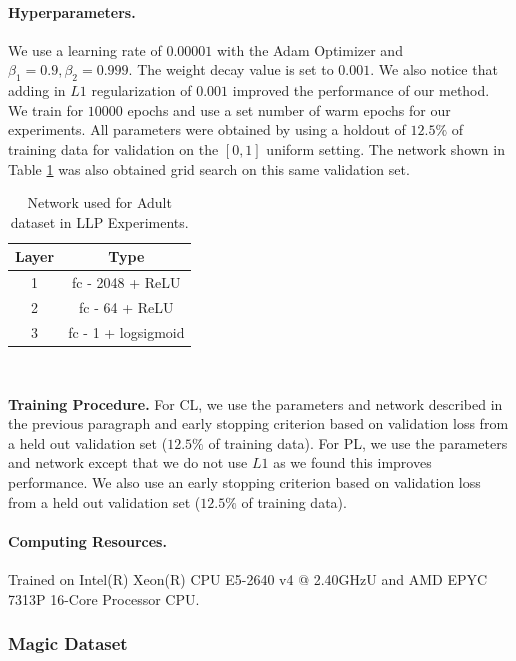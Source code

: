 \documentclass{article}
\begin{document}
\paragraph{Hyperparameters.}We use a learning rate of $0.00001$ with the Adam Optimizer and $\beta_1 = 0.9, \beta_2 = 0.999$. The weight decay value is set to $0.001$. We also notice that adding in $L1$ regularization of $0.001$ improved the performance of our method. We train for $10000$ epochs and use a set number of warm epochs for our experiments. All parameters were obtained by using a holdout of $12.5\%$ of training data for validation on the $[0, 1]$ uniform setting. The network shown in Table \ref{tab:Adult Net} was also obtained grid search on this same validation set.
\begin{table}[h]
    \centering
    \caption{Network used for Adult dataset in LLP Experiments.}
    \begin{tabular}{c|c}
        \toprule
         Layer & Type\\
         \midrule
         1 & fc - 2048 + ReLU\\
         2 & fc - 64 + ReLU\\
         3 & fc - 1 + logsigmoid\\
        \bottomrule
    \end{tabular}\\
    \label{tab:Adult Net}
\end{table}

\textbf{Training Procedure.} For CL, we use the parameters and network described in the previous paragraph and early stopping criterion based on validation loss from a held out validation set ($12.5\%$ of training data). For PL, we use the parameters and network except that we do not use $L1$ as we found this improves performance. We also use an early stopping criterion based on validation loss from a held out validation set ($12.5\%$ of training data).

\paragraph{Computing Resources.} Trained on Intel(R) Xeon(R) CPU E5-2640 v4 @ 2.40GHzU and AMD EPYC 7313P 16-Core Processor CPU.

\subsubsection{Magic Dataset}
\end{document}
